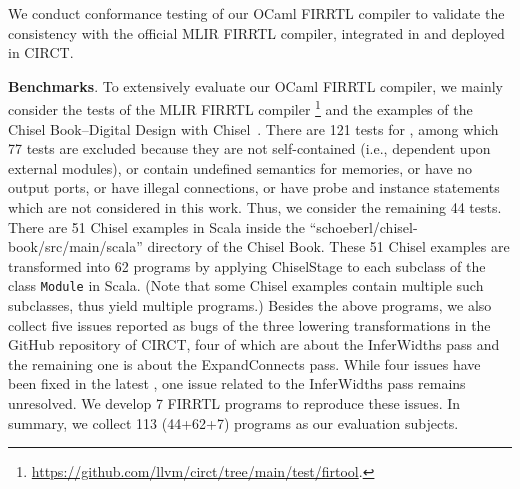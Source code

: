 
We conduct conformance testing of our OCaml FIRRTL compiler to validate the
consistency with the official MLIR FIRRTL compiler, integrated in {\firtool} and deployed in CIRCT.



\smallskip\noindent
{\bf Benchmarks}. To extensively evaluate our OCaml FIRRTL compiler,
we mainly consider the tests of the MLIR FIRRTL compiler {\firtool}\footnote{\url{https://github.com/llvm/circt/tree/main/test/firtool}.} and the examples
of the Chisel Book--Digital Design with Chisel~\cite{chisel:book}.
%
There are 121 tests for {\firtool}, among which 77 tests are excluded because they are not self-contained (i.e., dependent upon external modules),
or contain undefined semantics for memories, or have no output ports, or have illegal connections, or have probe and instance statements
which are not considered in this work. Thus, we consider the remaining 44 tests.
%
There are 51 Chisel examples in Scala inside the ``schoeberl/chisel-book/src/main/scala'' directory of the Chisel Book.
These 51 Chisel examples are transformed into 62 {\firrtl} programs by applying \textsf{ChiselStage}
to each subclass of the class {\tt Module} in Scala. (Note that some Chisel examples contain multiple such subclasses, thus yield multiple  {\firrtl} programs.)
%
Besides the above  {\firrtl} programs, we also collect five issues reported as bugs of the three lowering transformations in the GitHub repository
of CIRCT, four of which are about the InferWidths pass and the remaining one is about the ExpandConnects pass.
While four issues have been fixed in the latest {\firtool}, one issue related to the InferWidths pass remains unresolved.
We develop 7 FIRRTL programs to reproduce these issues.
%
In summary, we collect 113 (44+62+7)  {\firrtl} programs as our evaluation subjects. %

